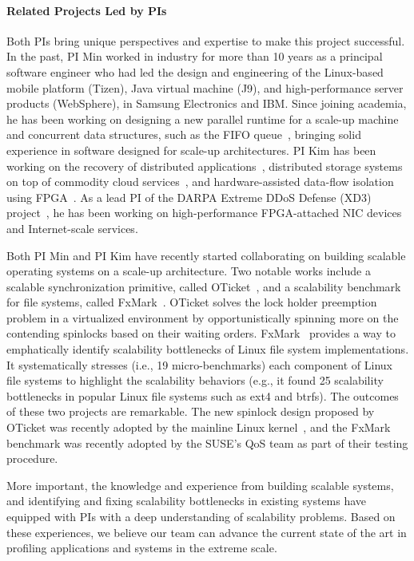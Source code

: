 \paragraph{Related Projects Led by PIs}
Both PIs bring unique perspectives and expertise to make
this project successful.
%
In the past, PI Min worked in industry for more than 10 years
as a principal software engineer
who had led the design and engineering
of the Linux-based mobile platform (Tizen), Java virtual machine (J9),
and high-performance server products (WebSphere),
in Samsung Electronics and IBM.
%
Since joining academia, he has been working on designing a new
parallel runtime for a scale-up
machine~\cite{Min:DANBI:PACT13} and concurrent data structures, such
as the FIFO queue~\cite{Min:LECDQ:TPDS15}, bringing solid experience in
software designed for scale-up architectures.
%
PI Kim has been working on the recovery of
distributed applications~\cite{chandra:aire},
distributed storage systems on top of commodity cloud
services~\cite{han:metasync, han:metasync2},
and hardware-assisted data-flow isolation using FPGA~\cite{song:hdfi}.
%
As a lead PI of the DARPA Extreme DDoS Defense (XD3)
project~\cite{xd3:web}, he has been working on high-performance
FPGA-attached NIC devices and Internet-scale services.

Both PI Min and PI Kim have recently started collaborating on
building scalable operating systems on a scale-up architecture.
%
Two notable works include
a scalable synchronization primitive,
called OTicket~\cite{kashyap:oticket, kashyap:oppspinlocks},
and a scalability benchmark for file systems, called
FxMark~\cite{min:fxmark}.
%
OTicket solves the lock holder preemption problem
in a virtualized environment
by opportunistically spinning more on the contending spinlocks
based on their waiting orders.
%
FxMark~\cite{min:fxmark} provides a way
to emphatically identify scalability bottlenecks
of Linux file system implementations.
It systematically stresses (i.e., 19 micro-benchmarks)
each component of Linux file systems 
to highlight the scalability behaviors
(e.g., it found 25 scalability bottlenecks in popular Linux file
systems such as ext4 and btrfs).
%
The outcomes of these two projects are remarkable.
%
The new spinlock design proposed by OTicket
was recently adopted by the mainline Linux kernel~\cite{waiman:spinlock},
and the FxMark benchmark was recently adopted
by the SUSE's QoS team as part of their testing procedure.

More important, the knowledge and experience from building scalable
systems, and identifying and fixing scalability bottlenecks in existing
systems have equipped with PIs with a deep understanding of
scalability problems. Based on these experiences, we believe our team
can advance the current state of the art in profiling applications and
systems in the extreme scale.
